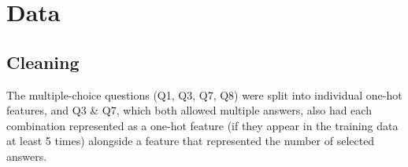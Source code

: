 \section{Data}






\subsection{Cleaning}
\label{sec:cleaning}
The multiple-choice questions (Q1, Q3, Q7, Q8) were split into individual one-hot features, and Q3 & Q7, which both allowed multiple answers, also had each combination represented as a one-hot feature (if they appear in the training data at least 5 times) alongside a feature that represented the number of selected answers.

